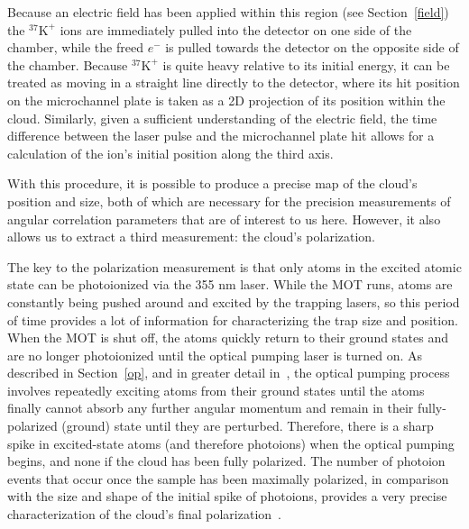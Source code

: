 Because an electric field has been applied within this region (see Section~\ref{field}) the $^{37}\textrm{K}^+$ ions are immediately pulled into the detector on one side of the chamber, while the freed $e^-$ is pulled towards the detector on the opposite side of the chamber.  Because  $^{37}\textrm{K}^+$ is quite heavy relative to its initial energy, it can be treated as moving in a straight line directly to the detector, where its hit position on the microchannel plate is taken as a 2D projection of its position within the cloud.  Similarly, given a sufficient understanding of the electric field, the time difference between the laser pulse and the microchannel plate hit allows for a calculation of the ion's initial position along the third axis.  



With this procedure, it is possible to produce a precise map of the cloud's position and size, both of which are necessary for the precision measurements of angular correlation parameters that are of interest to us here.  However, it also allows us to extract a third measurement:  the cloud's polarization.

The key to the polarization measurement is that only atoms in the excited atomic state can be photoionized via the 355 nm laser.  While the MOT runs, atoms are constantly being pushed around and excited by the trapping lasers, so this period of time provides a lot of information for characterizing the trap size and position.  When the MOT is shut off, the atoms quickly return to their ground states and are no longer photoionized until the optical pumping laser is turned on.  As described in Section~\ref{op}, and in greater detail in~\cite{ben_OP}, the optical pumping process involves repeatedly exciting atoms from their ground states until the atoms finally cannot absorb any further angular momentum and remain in their fully-polarized (ground) state until they are perturbed.  Therefore, there is a sharp spike in excited-state atoms (and therefore photoions) when the optical pumping begins, and none if %
the cloud has been fully polarized.  The number of photoion events that occur once the sample has been maximally polarized, in comparison with the size and shape of the initial spike of photoions, provides a very precise characterization of the cloud's final polarization~\cite{ben_OP}.



